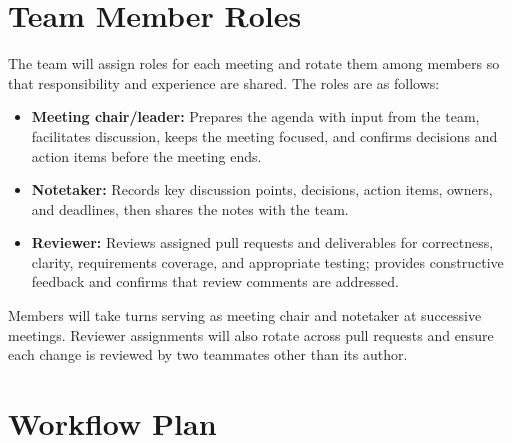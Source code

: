 \documentclass{article}
\begin{document}
\section{Team Member Roles}


The team will assign roles for each meeting and rotate them among members so
that responsibility and experience are shared. The roles are as follows:
\begin{itemize}
  \item \textbf{Meeting chair/leader:} Prepares the agenda with input from
  the team, facilitates discussion, keeps the meeting focused, and confirms
  decisions and action items before the meeting ends.
  \item \textbf{Notetaker:} Records key discussion points, decisions, action
  items, owners, and deadlines, then shares the notes with the team.
  \item \textbf{Reviewer:} Reviews assigned pull requests and deliverables
  for correctness, clarity, requirements coverage, and appropriate testing;
  provides constructive feedback and confirms that review comments are
  addressed.
\end{itemize}
Members will take turns serving as meeting chair and notetaker at successive
meetings. Reviewer assignments will also rotate across pull requests and ensure 
each change is reviewed by two teammates other than its author.

\section{Workflow Plan}
\end{document}
